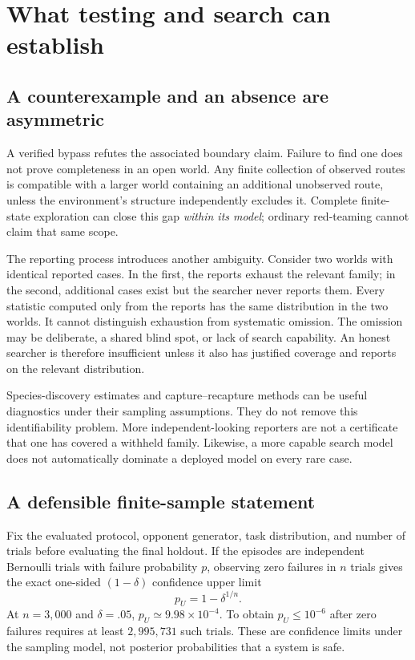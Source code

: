 \documentclass[10pt,twocolumn,letterpaper]{article}
\begin{document}
\section{What testing and search can establish}
\label{sec:search}

\subsection{A counterexample and an absence are asymmetric}
A verified bypass refutes the associated boundary claim. Failure to find one does not prove completeness in an open world. Any finite collection of observed routes is compatible with a larger world containing an additional unobserved route, unless the environment's structure independently excludes it. Complete finite-state exploration can close this gap \emph{within its model}; ordinary red-teaming cannot claim that same scope.

The reporting process introduces another ambiguity. Consider two worlds with identical reported cases. In the first, the reports exhaust the relevant family; in the second, additional cases exist but the searcher never reports them. Every statistic computed only from the reports has the same distribution in the two worlds. It cannot distinguish exhaustion from systematic omission. The omission may be deliberate, a shared blind spot, or lack of search capability. An honest searcher is therefore insufficient unless it also has justified coverage and reports on the relevant distribution.

Species-discovery estimates and capture--recapture methods can be useful diagnostics under their sampling assumptions. They do not remove this identifiability problem. More independent-looking reporters are not a certificate that one has covered a withheld family. Likewise, a more capable search model does not automatically dominate a deployed model on every rare case.

\subsection{A defensible finite-sample statement}
Fix the evaluated protocol, opponent generator, task distribution, and number of trials before evaluating the final holdout. If the episodes are independent Bernoulli trials with failure probability $p$, observing zero failures in $n$ trials gives the exact one-sided $(1-\delta)$ confidence upper limit \cite{clopper}
\begin{equation}
p_U=1-\delta^{1/n}.
\label{eq:binomial}
\end{equation}
At $n=3{,}000$ and $\delta=.05$, $p_U\simeq9.98\times10^{-4}$. To obtain $p_U\le10^{-6}$ after zero failures requires at least $2{,}995{,}731$ such trials. These are confidence limits under the sampling model, not posterior probabilities that a system is safe.
\end{document}
